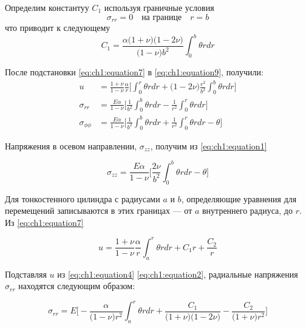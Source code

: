 Определим константуу \(C_1\) используя граничные условия
\begin{equation}
	\label{eq:ch1:equation10}
	\sigma_{rr} = 0 \quad \text{на границе} \quad r=b
\end{equation}
что приводит к следующему
\begin{equation}
	\label{eq:ch1:equation11}
	C_1 = \frac{\alpha \big(1+\nu\big) \big(1-2\nu\big)}{\big(1-\nu\big) b^2} \int_0^b \theta rdr
\end{equation}

После подстановки \cref{eq:ch1:equation7} в \cref{eq:ch1:equation9}, получили:
\begin{equation}
	\label{eq:ch1:equation12}
	\begin{split}
		u &= \frac{1+\nu}{1-\nu} \frac{\alpha}{r} \big[ \int_0^r \theta rdr +\big(1-2\nu\big ) \frac{r^2}{b^2}\int_0^b \theta r dr\big]\\
		\sigma_{rr} &= \frac{E \alpha}{1-\nu}\big[ \frac{1}{b^2}\int_0^b \theta rdr -\frac{1}{r^2}\int_0^r \theta r dr\big]\\
		\sigma_{\phi\phi} &= \frac{E \alpha}{1-\nu}\big[ \frac{1}{b^2}\int_0^b \theta rdr +\frac{1}{r^2}\int_0^r \theta r dr - \theta \big]
	\end{split}
\end{equation}

Напряжения в осевом направлении, \(\sigma_{zz}\), получим из \cref{eq:ch1:equation1}

\begin{equation}
	\label{eq:ch1:equation13}
	\sigma_{zz} = \frac{E \alpha}{1-\nu}\big[ \frac{2\nu}{b^2}\int_0^b \theta rdr  - \theta \big]
\end{equation}	
	
Для тонкостенного цилиндра с радиусами \(a\) и \(b\), определяющие уравнения для перемещений записываются в этих границах --- от \(a\) внутреннего радиуса, до \(r\). Из \cref{eq:ch1:equation7}

\begin{equation}
	\label{eq:ch1:equation14}
	u = \frac{1+\nu}{1-\nu} \frac{\alpha}{r} \int_a^r \theta rdr +C_1r +\frac{C_2}{r}
\end{equation}

Подставляя \(u\) из \cref{eq:ch1:equation4} \cref{eq:ch1:equation2}, радиальные напряжения \(\sigma_{rr}\) находятся следующим образом:

\begin{equation}
	\label{eq:ch1:equation15}
	\sigma_{rr} = E \big [-\frac{\alpha}{\big(1-\nu \big) r^2} \int_a^r \theta rdr + \frac{C_1}{\big (1+\nu\big ) \big(1-2\nu \big)} - \frac{C_2}{\big(1+\nu\big) r^2} \big]
\end{equation}


